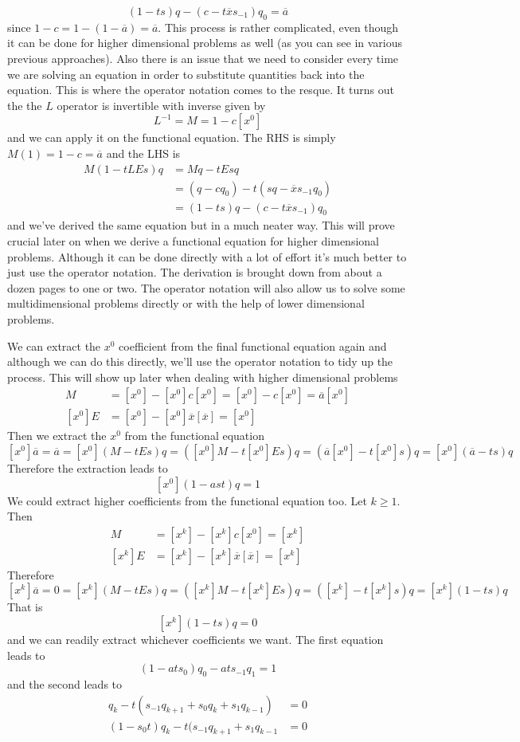 \documentclass[12pt]{article}
\theoremstyle{definition} \newtheorem{definition}[theorem]{Definition}
\newcommand{\ol}[1]{\overline{#1}}
\begin{document}
\[
	(1-ts)q - (c -t\ol{x}s_{-1})q_0 = \ol{a}
\]
since $1 - c = 1 - (1-\ol{a}) = \ol{a}$. This process is rather complicated, even though it can be done for higher dimensional problems as well (as you can see in various previous approaches). Also there is an issue that we need to consider every time we are solving an equation in order to substitute quantities back into the equation. This is where the operator notation comes to the resque. It turns out the the $L$ operator is invertible with inverse given by
\[
	L^{-1} = M = 1 -  c[x^0]
\]
and we can apply it on the functional equation. The RHS is simply $M(1) = 1 - c = \ol{a}$ and the LHS is
\begin{align*}
	M(1-tLEs)q &= Mq - tEsq \\
	&= (q-cq_0) - t(sq - \ol{x}s_{-1}q_0) \\
	&= (1-ts)q - (c-t\ol{x}s_{-1})q_0 
\end{align*}
and we've derived the same equation but in a much neater way. This will prove crucial later on when we derive a functional equation for higher dimensional problems. Although it can be done directly with a lot of effort it's much better to just use the operator notation. The derivation is brought down from about a dozen pages to one or two. The operator notation will also allow us to solve some multidimensional problems directly or with the help of lower dimensional problems.

We can extract the $x^0$ coefficient from the final functional equation again and although we can do this directly, we'll use the operator notation to tidy up the process. This will show up later when dealing with higher dimensional problems
\begin{align*}
	[x^0]M &= [x^0]-[x^0]c[x^0] = [x^0]-c[x^0] = \ol{a}[x^0]\\
	[x^0]E &= [x^0] - [x^0]\ol{x}[\ol{x}] = [x^0]
\end{align*}
Then we extract the $x^0$ from the functional equation
\[
	[x^0]\ol{a} = \ol{a} = [x^0](M - tEs)q = ([x^0]M - t[x^0]Es)q = (\ol{a}[x^0]-t[x^0]s)q = [x^0](\ol{a}-ts)q
\]
Therefore the extraction leads to
\[
	[x^0](1-ast)q = 1
\]
We could extract higher coefficients from the functional equation too. Let $k\ge 1$. Then
\begin{align*}
	[x^k]M &= [x^k]-[x^k]c[x^0] = [x^k]\\
	[x^k]E &= [x^k] - [x^k]\ol{x}[\ol{x}] = [x^k]
\end{align*}
Therefore
\[
	[x^k]\ol{a} = 0 = [x^k](M - tEs)q = ([x^k]M - t[x^k]Es)q = ([x^k] - t[x^k]s)q = [x^k](1-ts)q
\]
That is
\[
	[x^k](1-ts)q = 0
\]
and we can readily extract whichever coefficients we want. The first equation leads to
\[
	(1-ats_0)q_0-ats_{-1}q_1 = 1
\]
and the second leads to
\begin{align*}
	q_k - t(s_{-1}q_{k+1}+s_0q_k+s_1 q_{k-1}) &= 0\\
	 (1-s_0t) q_k -t(s_{-1}q_{k+1} + s_1 q_{k-1} &= 0
\end{align*}
\end{document}
